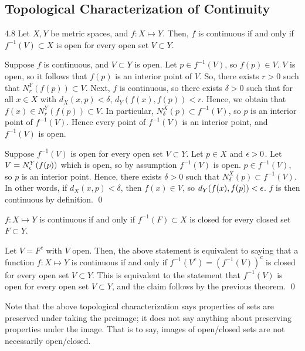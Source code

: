 \subsection{Topological Characterization of Continuity}
\begin{theorem}{}{4.8}
    Let $X, Y$ be metric spaces, and $f: X \mapsto Y$. Then, $f$ is continuous if and only if $f^{-1}(V) \subset X$ is open for every open set $V \subset Y$.
\end{theorem}
\begin{nproof}
    \boxed{\implies} Suppose $f$ is continuous, and $V \subset Y$ is open. Let $p \in f^{-1}(V)$, so $f(p) \in V$. $V$ is open, so it follows that $f(p)$ is an interior point of $V$. So, there exists $r > 0$ such that $N_r^Y(f(p)) \subset V$. Next, $f$ is continuous, so there exists $\delta > 0$ such that for all $x \in X$ with $d_X(x, p) < \delta$, $d_Y(f(x), f(p)) < r$. Hence, we obtain that $f(x) \in N_r^Y(f(p)) \subset V$. In particular, $N_\delta^X(p) \subset f^{-1}(V)$, so $p$ is an interior point of $f^{-1}(V)$. Hence every point of $f^{-1}(V)$ is an interior point, and $f^{-1}(V)$ is open.

    \boxed{\impliedby} Suppose $f^{-1}(V)$ is open for every open set $V \subset Y$. Let $p \in X$ and $\epsilon > 0$. Let $V = N_\epsilon^Y(f(p))$ which is open, so by assumption $f^{-1}(V)$ is open. $p \in f^{-1}(V)$, so $p$ is an interior point. Hence, there exists $\delta > 0$ such that $N_\delta^X(p) \subset f^{-1}(V)$. In other words, if $d_X(x, p) < \delta$, then $f(x) \in V$, so $d_Y(f(x), f(p)) < \epsilon$. $f$ is then continuous by definition. \qed
\end{nproof}

\begin{ncorollary}{}{}
    $f: X \mapsto Y$ is continuous if and only if $f^{-1}(F) \subset X$ is closed for every closed set $F \subset Y$.
\end{ncorollary}
\begin{nproof}
    Let $V = F^c$ with $V$ open. Then, the above statement is equivalent to saying that a function $f: X \mapsto Y$ is continuous if and only if $f^{-1}(V^c) = \left(f^{-1}(V)\right)^c$ is closed for every open set $V \subset Y$. This is equivalent to the statement that $f^{-1}(V)$ is open for every open set $V \subset Y$, and the claim follows by the previous theorem. \qed
\end{nproof}

\noindent Note that the above topological characterization says properties of sets are preserved under taking the preimage; it does not say anything about preserving properties under the image. That is to say, images of open/closed sets are not necessarily open/closed.

